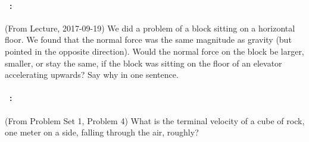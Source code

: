 \documentclass[12pt]{article}
\begin{document}
\vfill

\paragraph{\problemname~\theproblem:}%
(From Lecture, 2017-09-19)
We did a problem of a block sitting on a horizontal floor. We
found that the normal force was the same magnitude as gravity (but
pointed in the opposite direction). Would the normal force on the
block be larger, smaller, or stay the same, if the block was sitting
on the floor of an elevator accelerating upwards? Say why in one sentence.

\vfill

\paragraph{\problemname~\theproblem:}%
(From Problem Set 1, Problem 4)
What is the terminal velocity of a cube of rock, one meter on a side,
falling through the air, roughly?

\vfill
~
\end{document}
